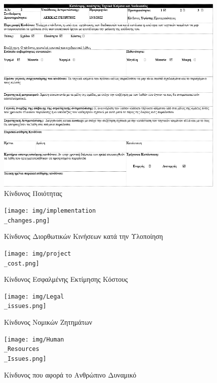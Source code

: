 \documentclass{../ol-softwaremanual}
\begin{document}
		\begin{figure}[htbp!]
		\includegraphics[scale=0.8]{img/bad quality.png}
		\caption{Κίνδυνος Ποιότητας}
	\end{figure}

		\newpage
	
	\begin{figure}[htbp!]
		\texttt{[image: img/implementation\\\_changes.png]}
		\caption{Κίνδυνος Διορθωτικών Κινήσεων κατά την Υλοποίηση}
	\end{figure}


	
		\newpage
	
	\begin{figure}[htbp!]
		\texttt{[image: img/project\\\_cost.png]}
		\caption{Κίνδυνος Εσφαλμένης Εκτίμησης Κόστους}
	\end{figure}

	\newpage

\begin{figure}[htbp!]
	\texttt{[image: img/Legal\\\_issues.png]}
	\caption{Κίνδυνος Νομικών Ζητημάτων}
\end{figure}


\newpage

\begin{figure}[htbp!]
	\texttt{[image: img/Human\\\_Resources\\\_Issues.png]}
	\caption{Kίνδυνος που αφορά το Ανθρώπινο Δυναμικό}
\end{figure}


	
	
	
\end{document}
